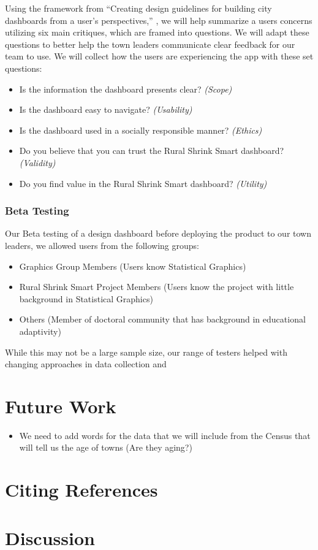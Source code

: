 \documentclass[letterpaper,inpress]{jdsart}
\providecommand{\tightlist}{%
  \setlength{\itemsep}{0pt}\setlength{\parskip}{0pt}}
\begin{document}
Using the framework from ``Creating design guidelines for building city dashboards from a user's perspectives,'' \citet{young}, we will help summarize a users concerns utilizing six main critiques, which are framed into questions. We will adapt these questions to better help the town leaders communicate clear feedback for our team to use. We will collect how the users are experiencing the app with these set questions:

\begin{itemize}
\item Is the information the dashboard presents clear? \textit{(Scope)}
\item Is the dashboard easy to navigate? \textit{(Usability)}
\item Is the dashboard used in a socially responsible manner? \textit{(Ethics)}
\item Do you believe that you can trust the Rural Shrink Smart dashboard? \textit{(Validity)}
\item Do you find value in the Rural Shrink Smart dashboard? \textit{(Utility)}
\end{itemize}

\subsubsection{Beta Testing}

Our Beta testing of a design dashboard before deploying the product to our town leaders, we allowed users from the following groups:

\begin{itemize}
    \item Graphics Group Members (Users know Statistical Graphics)
    \item Rural Shrink Smart Project Members (Users know the project with little background in Statistical Graphics)
    \item  Others (Member of doctoral community that has background in educational adaptivity)
\end{itemize}

While this may not be a large sample size, our range of testers helped with changing approaches in data collection and

\hypertarget{future-work}{%
\section{Future Work}\label{future-work}}

\begin{itemize}
\tightlist
\item
  We need to add words for the data that we will include from the Census that will tell us the age of towns (Are they aging?)
\end{itemize}

\hypertarget{citing-references}{%
\section{Citing References}\label{citing-references}}

\hypertarget{discussion}{%
\section{Discussion}\label{discussion}}

\lipsum[1-3]



\end{document}
